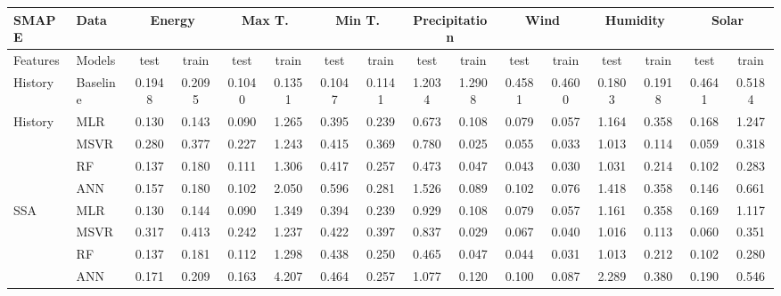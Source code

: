 \documentclass[conference]{IEEEtran}
\begin{document}
\begin{table*}
\begin{tabular}{|p{0.8cm}|p{0.8cm}||c|c||c|c|c|c|c|c|c|c|c|c|c|c|}
\hline
SMAPE & Data & \multicolumn{2}{c||}{Energy} & \multicolumn{2}{c|}{Max T.} & \multicolumn{2}{c|}{Min T.}  & \multicolumn{2}{c|}{Precipitation}  & \multicolumn{2}{c|}{Wind} &  \multicolumn{2}{c|}{Humidity} &  \multicolumn{2}{c|}{Solar} \\
\hline
Features & Models & test & train & test &  train & test &  train & test &  train & test &  train & test &  train & test &  train\\
\hline
\hline
History & Baseline & 0.1948  &  0.2095 &   0.1040  &  0.1351 & 0.1047  &  0.1141  &  1.2034  &  1.2908 & 0.4581  &  0.4600  &  0.1803  &  0.1918 & 0.4641  &  0.5184\\
\hline
\hline
\multirow{4}{*}{History} &MLR &   0.130 &    0.143 &    0.090 &    1.265 &    0.395 &    0.239 &    0.673 &    0.108 &    0.079 &    0.057 &    1.164 &    0.358 &    0.168 &    1.247\\
\cline{2-16}
 &MSVR &   0.280 &    0.377 &    0.227 &    1.243 &    0.415 &    0.369 &    0.780 &    0.025 &    0.055 &    0.033 &    1.013 &    0.114 &    0.059 &    0.318\\
\cline{2-16}
 &RF &   0.137 &    0.180 &    0.111 &    1.306 &    0.417 &    0.257 &    0.473 &    0.047 &    0.043 &    0.030 &    1.031 &    0.214 &    0.102 &    0.283\\
\cline{2-16}
 &ANN &   0.157 &    0.180 &    0.102 &    2.050 &    0.596 &    0.281 &    1.526 &    0.089 &    0.102 &    0.076 &    1.418 &    0.358 &    0.146 &    0.661\\
\cline{2-16}
\hline
\hline
\multirow{4}{*}{SSA} &MLR &   0.130 &    0.144 &    0.090 &    1.349 &    0.394 &    0.239 &    0.929 &    0.108 &    0.079 &    0.057 &    1.161 &    0.358 &    0.169 &    1.117\\
\cline{2-16}
 &MSVR &   0.317 &    0.413 &    0.242 &    1.237 &    0.422 &    0.397 &    0.837 &    0.029 &    0.067 &    0.040 &    1.016 &    0.113 &    0.060 &    0.351\\
\cline{2-16}
 &RF &   0.137 &    0.181 &    0.112 &    1.298 &    0.438 &    0.250 &    0.465 &    0.047 &    0.044 &    0.031 &    1.013 &    0.212 &    0.102 &    0.280\\
\cline{2-16}
 &ANN &   0.171 &    0.209 &    0.163 &    4.207 &    0.464 &    0.257 &    1.077 &    0.120 &    0.100 &    0.087 &    2.289 &    0.380 &    0.190 &    0.546\\

\end{tabular}
\end{table*}
\end{document}
